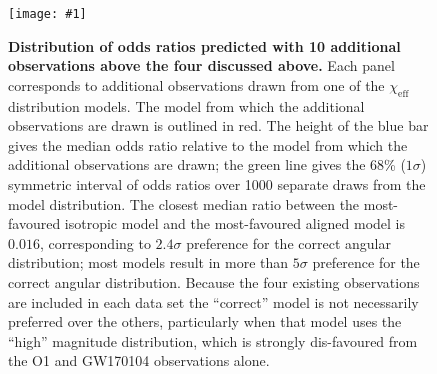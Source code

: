\documentclass{nature-arxiv}
\newcommand{\chieff}{\chi_\mathrm{eff}}
\newcommand{\OTwoSigmaIsoAlignedMin}{2.4}
\newcommand{\OTwoOddsIsoAlignedMin}{0.016}
\newcommand{\plotone}[1]{\texttt{[image: \#1]}}
\begin{document}
\begin{figure}
  \plotone{../plots/six-way-O2-model-selection}
  \caption{\label{fig:O2-predictions} \textbf{Distribution of odds
      ratios predicted with 10 additional observations above the four
      discussed above.}  Each panel corresponds to additional
    observations drawn from one of the $\chieff$ distribution models.
    The model from which the additional observations are drawn is
    outlined in red.  The height of the blue bar gives the median odds
    ratio relative to the model from which the additional observations
    are drawn; the green line gives the 68\% ($1 \sigma$) symmetric
    interval of odds ratios over 1000 separate draws from the model
    distribution.  The closest median ratio between the most-favoured
    isotropic model and the most-favoured aligned model is
    $\OTwoOddsIsoAlignedMin$, corresponding to
    $\OTwoSigmaIsoAlignedMin\sigma$ preference for the correct angular
    distribution; most models result in more than $5\sigma$ preference
    for the correct angular distribution.  Because the four existing
    observations are included in each data set the ``correct'' model
    is not necessarily preferred over the others, particularly when
    that model uses the ``high'' magnitude distribution, which is
    strongly dis-favoured from the O1 and GW170104 observations
    alone.}
\end{figure}
\end{document}
